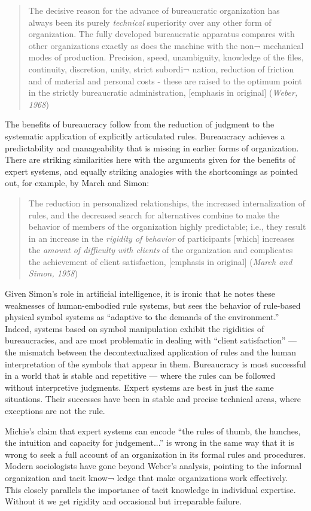 \documentclass[12pt]{article}
\def\bq{\begin{quote}}
\def\eq{\end{quote}}
\begin{document}
\bq
The decisive reason for the advance of bureaucratic organization has always been its purely {\it technical} superiority over any other form of organization. The fully developed bureaucratic apparatus compares with other organizations exactly as does the machine with the non¬ mechanical modes of production. Precision, speed, unambiguity, knowledge of the files, continuity, discretion, unity, strict subordi¬ nation, reduction of friction and of material and personal costs - these are raised to the optimum point in the strictly bureaucratic administration, [emphasis in original] ({\it Weber, 1968})
\eq

The benefits of bureaucracy follow from the reduction of judgment to the systematic application of explicitly articulated rules. Bureaucracy achieves a predictability and manageability that is missing in earlier forms of organization. There are striking similarities here with the arguments given for the benefits of expert systems, and equally striking analogies with the shortcomings as pointed out, for example, by March and Simon:

\bq
The reduction in personalized relationships, the increased internalization of rules, and the decreased search for alternatives combine to make the behavior of members of the organization highly predictable; i.e., they result in an increase in the {\it rigidity of behavior} of participants [which] increases the {\it amount of difficulty with clients} of the organization and complicates the achievement of client satisfaction, [emphasis in original] ({\it March and Simon, 1958})
\eq

Given Simon’s role in artificial intelligence, it is ironic that he notes these weaknesses of human-embodied rule systems, but sees the behavior of rule-based physical symbol systems as ``adaptive to the demands of the environment.'' Indeed, systems based on symbol manipulation exhibit the rigidities of bureaucracies, and are most problematic in dealing with ``client satisfaction'' --- the mismatch between the decontextualized application of rules and the human interpretation of the symbols that appear in them. Bureaucracy is most successful in a world that is stable and repetitive --- where the rules can be followed without interpretive judgments. Expert systems are best in just the same situations. Their successes have been in stable and precise technical areas, where exceptions are not the rule.

Michie’s claim that expert systems can encode “the rules of thumb, the hunches, the intuition and capacity for judgement...” is wrong in the same way that it is wrong to seek a full account of an organization in its formal rules and procedures. Modern sociologists have gone beyond Weber’s analysis, pointing to the informal organization and tacit know¬ ledge that make organizations work effectively. This closely parallels the importance of tacit knowledge in individual expertise. Without it we get rigidity and occasional but irreparable failure.
\end{document}
